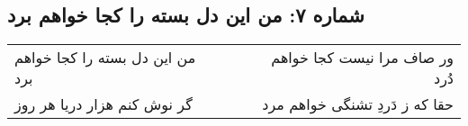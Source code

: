 \begin{center}
\section*{شماره ۷: من این دل بسته را کجا خواهم برد}
\label{sec:007}
\begin{longtable}{l p{0.5cm} r}
من این دل بسته را کجا خواهم برد
&&
ور صاف مرا نیست کجا خواهم دُرد
\\
گر نوش کنم هزار دریا هر روز
&&
حقا که ز دَردِ تشنگی خواهم مرد
\\
\end{longtable}
\end{center}

